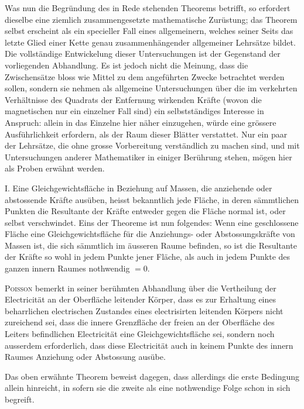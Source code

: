Was nun die Begründung des in Rede stehenden Theorems betrifft, so
erfordert dieselbe eine ziemlich zusammengesetzte mathematische Zurüstung; das
Theorem selbst erscheint als ein specieller Fall eines allgemeinern, welches
seiner Seits das letzte Glied einer Kette genau zusammenhängender allgemeiner
Lehrsätze bildet. Die vollständige Entwickelung dieser Untersuchungen ist der
Gegenstand der vorliegenden Abhandlung. Es ist jedoch nicht die Meinung,
dass die Zwischensätze bloss wie Mittel zu dem angeführten Zwecke betrachtet
werden sollen, sondern sie nehmen als allgemeine Untersuchungen über die im
verkehrten Verhältnisse des Quadrats der Entfernung wirkenden Kräfte (wovon
die magnetischen nur ein einzelner Fall sind) ein selbstständiges Interesse in
Anspruch: allein in das Einzelne hier näher einzugehen, würde eine grössere
Ausführlichkeit erfordern, als der Raum dieser Blätter verstattet. Nur ein paar
der Lehrsätze, die ohne grosse Vorbereitung verständlich zu machen sind, und mit
\clearpage
{}
\noindent
Untersuchungen anderer Mathematiker in einiger Berührung stehen, mögen hier
als Proben erwähnt werden.

I. Eine Gleichgewichtsfläche in Beziehung auf Massen, die anziehende oder
abstossende Kräfte ausüben, heisst bekanntlich jede Fläche, in deren sämmtlichen
Punkten die Resultante der Kräfte entweder gegen die Fläche normal ist, oder
selbst verschwindet. Eins der Theoreme ist nun folgendes: Wenn eine geschlossene
Fläche eine Gleichgewichtsfläche für die Anziehungs- oder Abstossungskräfte
von Massen ist, die sich sämmtlich im äusseren Raume befinden, so ist
die Resultante der Kräfte so wohl in jedem Punkte jener Fläche, als auch in
jedem Punkte des ganzen innern Raumes nothwendig \(=0\).

\textsc{Poisson} bemerkt in seiner berühmten Abhandlung über die Vertheilung der
Electricität an der Oberfläche leitender Körper, dass es zur Erhaltung eines
beharrlichen electrischen Zustandes eines electrisirten leitenden Körpers nicht
zureichend sei, dass die innere Grenzfläche der freien an der Oberfläche des
Leiters befindlichen Electricität eine Gleichgewichtsfläche sei, sondern noch
ausserdem erforderlich, dass diese Electricität auch in keinem Punkte des innern
Raumes Anziehung oder Abstossung ausübe.

Das oben erwähnte Theorem beweist dagegen, dass allerdings die erste
Bedingung allein hinreicht, in sofern sie die zweite als eine nothwendige Folge
schon in sich begreift.

